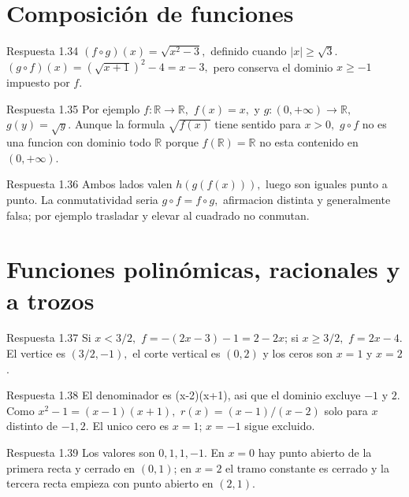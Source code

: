 \documentclass[10pt,a4paper,oneside,openany]{book}
\begin{document}
\section{Composición de funciones}
\begin{PSevenAnswerFixed}{Respuesta 1.34}
\((f\circ g)(x)=\sqrt{x^{2}-3},\) definido cuando \(|x|\ge \sqrt{3}\). \((g\circ f)(x)=(\sqrt{x+1})^{2}-4=x-3,\) pero conserva el dominio \(x\ge -1\) impuesto por \(f\).
\end{PSevenAnswerFixed}
\begin{PSevenAnswerFixed}{Respuesta 1.35}
Por ejemplo \(f:\mathbb{R}\to \mathbb{R},\) \(f(x)=x,\) y \(g:(0,+\infty )\to \mathbb{R},\) \(g(y)=\sqrt{y}\). Aunque la formula \(\sqrt{f(x)}\) tiene sentido para \(x>0,\) \(g\circ f\) no es una funcion con dominio todo \(\mathbb{R}\) porque \(f(\mathbb{R})=\mathbb{R}\) no esta contenido en \((0,+\infty )\).
\end{PSevenAnswerFixed}
\begin{PSevenAnswerFixed}{Respuesta 1.36}
Ambos lados valen \(h(g(f(x))),\) luego son iguales punto a punto. La conmutatividad seria \(g\circ f=f\circ g,\) afirmacion distinta y generalmente falsa; por ejemplo trasladar y elevar al cuadrado no conmutan.
\end{PSevenAnswerFixed}
\section{Funciones polinómicas, racionales y a trozos}
\begin{PSevenAnswerFixed}{Respuesta 1.37}
Si \(x<3/2,\) \(f=-(2x-3)-1=2-2x\); si \(x\ge 3/2,\) \(f=2x-4\). El vertice es \((3/2,-1),\) el corte vertical es \((0,2)\) y los ceros son \(x=1\) y \(x=2\).
\end{PSevenAnswerFixed}
\begin{PSevenAnswerFixed}{Respuesta 1.38}
El denominador es (x-2)(x+1), asi que el dominio excluye \(-1\) y \(2\). Como \(x^{2}-1=(x-1)(x+1),\) \(r(x)=(x-1)/(x-2)\) solo para \(x\) distinto de \(-1,2\). El unico cero es \(x=1\); \(x=-1\) sigue excluido.
\end{PSevenAnswerFixed}
\begin{PSevenAnswerFixed}{Respuesta 1.39}
Los valores son \(0,1,1,-1\). En \(x=0\) hay punto abierto de la primera recta y cerrado en \((0,1)\); en \(x=2\) el tramo constante es cerrado y la tercera recta empieza con punto abierto en \((2,1)\).
\end{PSevenAnswerFixed}
\end{document}
